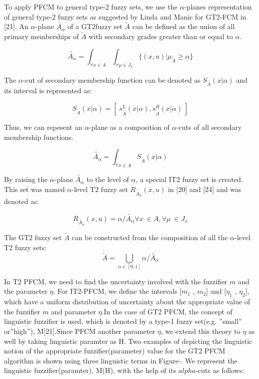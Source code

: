 \documentclass[journal, onecolumn]{IEEEtran}
\begin{document}
To apply PFCM to general type-2 fuzzy sets, we use the $\alpha$-planes representation of general type-2 fuzzy sets as suggested by Linda and Manic for GT2-FCM in [21]. An $\alpha$-plane $\tilde{A_{\alpha}}$ of a GT2fuzzy set $\tilde{A}$ can be defined as the union of all primary memberships of $\tilde{A}$ with secondary grades greater than or equal to $\alpha$.


\begin{equation}
\tilde{A_{\alpha}}= \int_{\forall x \in{A}}\int_{\forall \mu \in{J_x}}{ \{(x,u)|\mu_{\tilde{A}} \geq \alpha  \}}
\end{equation}

The $\alpha$-cut of secondary membership function can be denoted as $S_{\tilde{A}}(x|\alpha)$ and its interval is represented as: 

\begin{equation}
S_{\tilde{A}}(x|\alpha)= [\: s_{\tilde{A}}^L(x|\alpha), s_{\tilde{A}}^R(x|\alpha) \:]
\end{equation}

Thus, we can repesent an $\alpha$-plane as a composition of $\alpha$-cuts of all secondary membership functions.

\begin{equation}
\tilde{A_{\alpha}}= \int_{\forall x \in{A}} {S_{\tilde{A}}(x|\alpha)}
\end{equation}

By raising the $\alpha$-plane $\tilde{A_{\alpha}}$ to the level of $\alpha$, a special IT2 fuzzy set is created. This set was named $\alpha$-level T2 fuzzy set
$R_{\tilde{A_{\alpha}}}(x,u)$ in [20] and [24] and was denoted as: 

\begin{equation}
R_{\tilde{A_{\alpha}}}(x,u)= \alpha/\tilde{A_{\alpha}} \forall x \: \in{A}, \forall \mu \: \in{J_x} 
\end{equation}

The GT2 fuzzy set $\tilde{A}$ can be constructed from the composition of all the $\alpha$-level T2 fuzzy sets:
\begin{equation}
\tilde{A}=\bigcup_{\alpha \in{[0,1]}} \alpha / {\tilde{A_{\alpha}}}
\end{equation}

In T2 PFCM, we need to find the uncertainty involved with the fuzzifier $m$ and the parameter $\eta$. For IT2-PFCM, we define the intervals [$m_1$ , $m_2$] and [$\eta_1$ , $\eta_2$], which have a uniform distribution of uncertainty about the appropriate value of the fuzzifier $m$ and parameter $\eta$.In the case of GT2 PFCM, the concept of linguistic fuzzifier is used, which is denoted by a type-1 fuzzy set(e.g. ”small” or”high”), M[21].Since PFCM another parameter $\eta$, we extend this theory to $\eta$ as well by taking linguistic paramter as H. Two examples of depicting the linguistic notion of the appropriate fuzzifier(parameter) value for the GT2 PFCM algorithm is shown using three linguistic terms in Figure-. We represent the linguistic fuzzifier(paramter), M(H), with the help of its $alpha$-cuts as follows:
\end{document}
